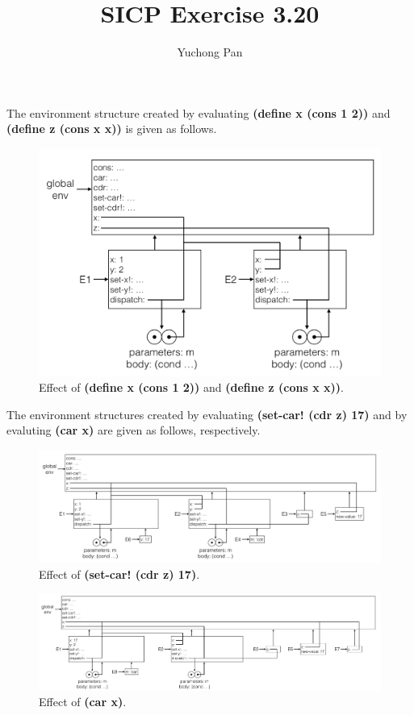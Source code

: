 \documentclass[11pt, oneside]{article}
\title{SICP Exercise 3.20}
\author{Yuchong Pan}
\begin{document}
\maketitle

The environment structure created by evaluating \textbf{(define x (cons 1 2))} and \textbf{(define z (cons x x))} is given as follows.

\begin{figure}[h!]
    \centering\includegraphics[width=15cm]{ex-3.20-1.png}
    \caption{Effect of \textbf{(define x (cons 1 2))} and \textbf{(define z (cons x x))}.}
\end{figure}

The environment structures created by evaluating \textbf{(set-car! (cdr z) 17)} and by evaluting \textbf{(car x)} are given as follows, respectively.

\begin{figure}[h!]
    \centering\includegraphics[width=15cm]{ex-3.20-2.png}
    \caption{Effect of \textbf{(set-car! (cdr z) 17)}.}
\end{figure}

\begin{figure}[h!]
    \centering\includegraphics[width=15cm]{ex-3.20-3.png}
    \caption{Effect of \textbf{(car x)}.}
\end{figure}
\end{document}

